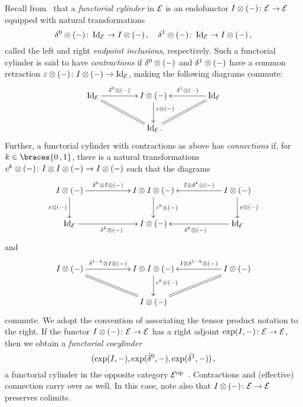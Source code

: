 \documentclass[reqno,10pt,a4paper,oneside,draft]{amsart}
\begin{document}
Recall from~\cite{kamps-porter:homotopy} that a \emph{functorial cylinder} in $\mathcal{E}$ is an endofunctor $I \otimes (-) \colon \mathcal{E} \to \mathcal{E}$ equipped with natural transformations
\[
\delta^0 \otimes (-) \colon \operatorname{Id}_{\mathcal{E}} \to I \otimes (-)
\, , \quad
\delta^1 \otimes (-) \colon \operatorname{Id}_{\mathcal{E}} \to I \otimes (-)
\, ,\]
called the left and right \emph{endpoint inclusions}, respectively.
Such a functorial cylinder is said to have \emph{contractions} if $\delta^0 \otimes (-)$ and $\delta^1 \otimes (-)$ have a common retraction $\varepsilon \otimes (-) \colon I \otimes (-) \to \operatorname{Id}_{\mathcal{E}}$, making the following diagrams commute:
\[
\xymatrix@C+2em{
  \Id_\catE
  \ar[r]^-{\lcyl \otimes (-)}
  \ar@{=}[dr]
&
  \interval \otimes (-)
  \ar[d]^(0.4){\ccyl \otimes (-)}
&
  \Id_\catE
  \ar[l]_-{\rcyl \otimes (-)}
  \ar@{=}[dl]
\\&
  \Id_\catE
\rlap{.}}
\]
Further, a functorial cylinder with contractions as above has \emph{connections} if, for $k \in \braces{0\,, 1}$, there is a natural transformations $c^k \otimes (-) \colon I \otimes I \otimes (-) \to I \otimes (-)$ such that the diagrams
\begin{equation} \label{connections:0}
\begin{gathered}
\xymatrix@C+3em{
  \interval \otimes (-)
  \ar[r]^-{\kcyl \otimes \interval \otimes (-)}
  \ar[d]_{\ccyl \otimes (-)}
&
  \interval \otimes \interval \otimes (-)
  \ar[d]^{c^k \otimes (-)}
&
  \interval \otimes (-)
  \ar[l]_-{\interval \otimes \kcyl \otimes (-)}
  \ar[d]^{\ccyl \otimes (-)}
\\
  \Id_\catE
  \ar[r]_{\kcyl \otimes (-)}
&
  \interval \otimes (-)
&
  \Id_\catE
  \ar[l]^{\kcyl \otimes (-)}
}
\end{gathered}
\end{equation}
and
\begin{equation} \label{connections:1}
\begin{gathered}
\xymatrix@C+3em{
  \interval \otimes (-)
  \ar[r]^-{\kcylinv \otimes \interval \otimes (-)}
  \ar@{=}[dr]
&
  \interval \otimes \interval \otimes (-)
  \ar[d]^(0.4){c^k \otimes (-)}
&
  \interval \otimes (-)
  \ar[l]_-{\interval \otimes \kcylinv \otimes (-)}
  \ar@{=}[dl]
\\&
  \interval \otimes (-)
}
\end{gathered}
\end{equation}
commute.
We adopt the convention of associating the tensor product notation to the right.
If the functor $I\otimes (-) \colon \mathcal{E} \to \mathcal{E}$ has a right adjoint
$\exp(I, -) \colon \mathcal{E} \to \mathcal{E}$, then we obtain a \emph{functorial cocylinder}
\[
(\exp(I, -), \exp(\bar{\delta}^0, -), \exp(\bar{\delta}^1, -)) \, ,
\]
\ie a functorial cylinder in the opposite category $\mathcal{E}^{\operatorname{op}}$~\cite{kamps-porter:homotopy}.
Contractions and (effective) connection carry over as well.
In this case, note also that $I\otimes (-) \colon \mathcal{E} \to \mathcal{E}$ preserves colimits.
\end{document}
